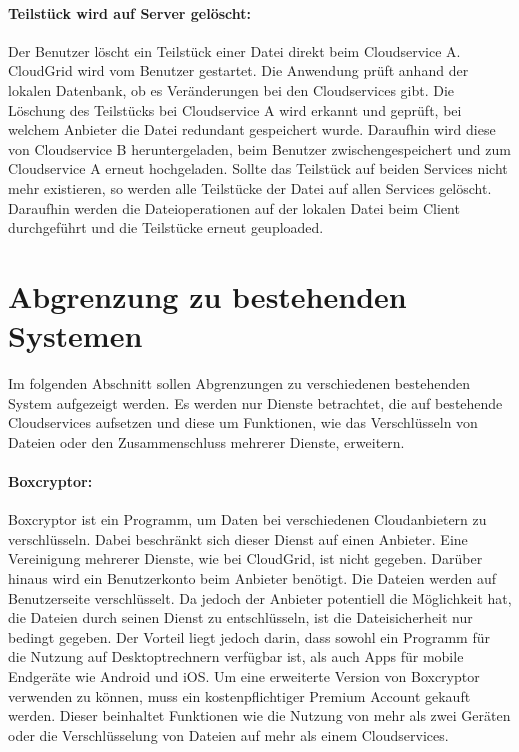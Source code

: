 \paragraph{Teilstück wird auf Server gelöscht:}
Der Benutzer löscht ein Teilstück einer Datei direkt beim Cloudservice A.
CloudGrid wird vom Benutzer gestartet.
Die Anwendung prüft anhand der lokalen Datenbank, ob es Veränderungen bei den Cloudservices gibt.
Die Löschung des Teilstücks bei Cloudservice A wird erkannt und geprüft, bei welchem Anbieter die Datei redundant gespeichert wurde.
Daraufhin wird diese von Cloudservice B heruntergeladen, beim Benutzer zwischengespeichert und zum Cloudservice A erneut hochgeladen.
Sollte das Teilstück auf beiden Services nicht mehr existieren, so werden alle Teilstücke der Datei auf allen Services gelöscht.
Daraufhin werden die Dateioperationen auf der lokalen Datei beim Client durchgeführt und die Teilstücke erneut geuploaded.

\section{Abgrenzung zu bestehenden Systemen}
\label{anforderungabgrenzung}
Im folgenden Abschnitt sollen Abgrenzungen zu verschiedenen bestehenden System aufgezeigt werden.
Es werden nur Dienste betrachtet, die auf bestehende Cloudservices aufsetzen und diese um Funktionen, wie das Verschlüsseln von Dateien oder den Zusammenschluss mehrerer Dienste, erweitern.

\paragraph{Boxcryptor:}
Boxcryptor ist ein Programm, um Daten bei verschiedenen Cloudanbietern zu verschlüsseln.
Dabei beschränkt sich dieser Dienst auf einen Anbieter.
Eine Vereinigung mehrerer Dienste, wie bei CloudGrid, ist nicht gegeben.
Darüber hinaus wird ein Benutzerkonto beim Anbieter benötigt.
Die Dateien werden auf Benutzerseite verschlüsselt.
Da jedoch der Anbieter potentiell die Möglichkeit hat, die Dateien durch seinen Dienst zu entschlüsseln, ist die Dateisicherheit nur bedingt gegeben.
Der Vorteil liegt jedoch darin, dass sowohl ein Programm für die Nutzung auf Desktoptrechnern verfügbar ist, als auch \acp{App} für mobile Endgeräte wie Android und iOS.
Um eine erweiterte Version von Boxcryptor verwenden zu können, muss ein kostenpflichtiger Premium Account gekauft werden.
Dieser beinhaltet Funktionen wie die Nutzung von mehr als zwei Geräten oder die Verschlüsselung von Dateien auf mehr als einem Cloudservices.

